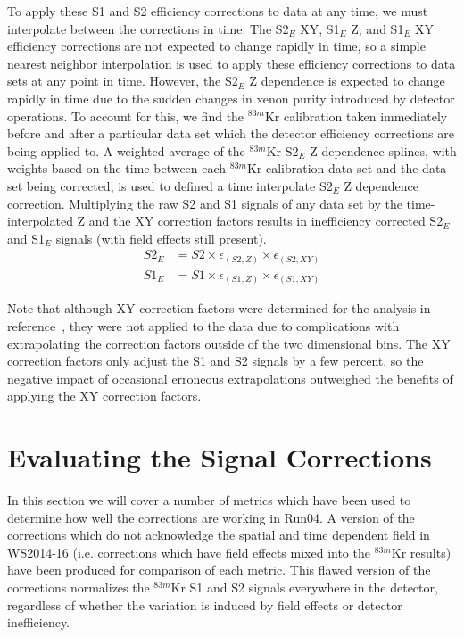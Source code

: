 \documentclass[a4paper,10pt,twocolumn]{article}
\begin{document}
To apply these S1 and S2 efficiency corrections to data at any time, we must interpolate between the corrections in time.  The S2$_E$ XY, S1$_E$ Z, and S1$_E$ XY efficiency corrections are not expected to change rapidly in time, so a simple nearest neighbor interpolation is used to apply these efficiency corrections to data sets at any point in time.  However, the S2$_E$ Z dependence is expected to change rapidly in time due to the sudden changes in xenon purity introduced by detector operations.  To account for this, we find the $^{83m}$Kr calibration taken immediately before and after a particular data set which the detector efficiency corrections are being applied to.  A weighted average of the $^{83m}$Kr S2$_E$ Z dependence splines, with weights based on the time between each $^{83m}$Kr calibration data set and the data set being corrected, is used to defined a time interpolate S2$_E$ Z dependence correction.  Multiplying the raw S2 and S1 signals of any data set by the time-interpolated Z and the XY correction factors results in inefficiency corrected S2$_E$ and S1$_E$ signals (with field effects still present).
\begin{align}
S2_E &=S2 \times \epsilon_{(S2,Z)} \times \epsilon_{(S2,XY)} \\
S1_E &=S1 \times \epsilon_{(S1,Z)} \times \epsilon_{(S1,XY)}
\end{align}

Note that although XY correction factors were determined for the analysis in reference~\cite{Run4paper}, they were not applied to the data due to complications with extrapolating the correction factors outside of the two dimensional bins.  The XY correction factors only adjust the S1 and S2 signals by a few percent, so the negative impact of occasional erroneous extrapolations outweighed the benefits of applying the XY correction factors.

\section{Evaluating the Signal Corrections} \label{Results}

In this section we will cover a number of metrics which have been used to determine how well the corrections are working in Run04.  A version of the corrections which do not acknowledge the spatial and time dependent field in WS2014-16 (i.e. corrections which have field effects mixed into the $^{83m}$Kr results) have been produced for comparison of each metric. This flawed version of the corrections normalizes the $^{83m}$Kr S1 and S2 signals everywhere in the detector, regardless of whether the variation is induced by field effects or detector inefficiency. 
\end{document}
